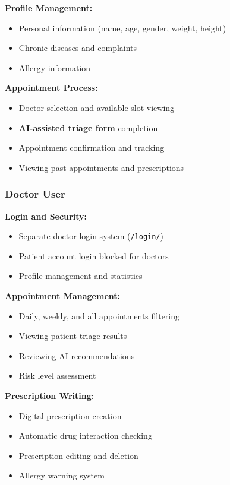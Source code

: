 \documentclass[12pt,a4paper]{article}
\begin{document}
\textbf{Profile Management:}
\begin{itemize}
    \item Personal information (name, age, gender, weight, height)
    \item Chronic diseases and complaints
    \item Allergy information
\end{itemize}

\textbf{Appointment Process:}
\begin{itemize}
    \item Doctor selection and available slot viewing
    \item \textbf{AI-assisted triage form} completion
    \item Appointment confirmation and tracking
    \item Viewing past appointments and prescriptions
\end{itemize}

\subsubsection{Doctor User}
\textbf{Login and Security:}
\begin{itemize}
    \item Separate doctor login system (\texttt{/login/})
    \item Patient account login blocked for doctors
    \item Profile management and statistics
\end{itemize}

\textbf{Appointment Management:}
\begin{itemize}
    \item Daily, weekly, and all appointments filtering
    \item Viewing patient triage results
    \item Reviewing AI recommendations
    \item Risk level assessment
\end{itemize}

\textbf{Prescription Writing:}
\begin{itemize}
    \item Digital prescription creation
    \item Automatic drug interaction checking
    \item Prescription editing and deletion
    \item Allergy warning system
\end{itemize}
\end{document}
